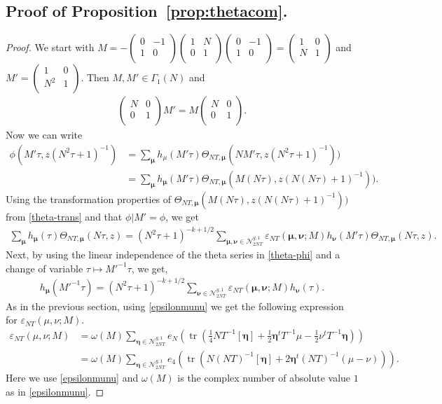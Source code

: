 \documentclass[11pt]{amsart}
\numberwithin{equation}{section}
\newcommand{\mc}{\mathcal}
\newcommand{\smat}[4]{\left( \begin{smallmatrix} #1 & #2 \\ #3 & #4 \\ \end{smallmatrix} \right)}
\DeclareMathOperator{\tr}{tr}
\newcommand{\sumn}{\sum \nolimits}
\begin{document}
\subsection{Proof of Proposition~\ref{prop:thetacom}.}
\begin{proof}
We start with $M=-\smat{0}{-1}{1}{0}\smat{1}{N}{0}{1}\smat{0}{-1}{1}{0}= \smat{1}{0}{N}{1}$ and $M'=\smat{1}{0}{N^2}{1}$. Then $M, M'\in \Gamma_1(N)$ and
\begin{align}\label{commuteN}
    \smat{N}{0}{0}{1}M'= M\smat{N}{0}{0}{1}.
\end{align} 
Now we can write
\begin{align}
    \phi(M'\tau, z(N^2\tau+1)^{-1}) &= \sumn_{\bm\mu} h_\mu(M'\tau)\Theta_{NT, \bm\mu}(NM'\tau, z(N^2\tau+1)^{-1}))\\
    &= \sumn_{\bm\mu} h_{\bm\mu}(M'\tau)\Theta_{NT, \bm\mu}(M(N\tau), z(N(N\tau)+1)^{-1})).
\end{align}
Using the transformation properties of $\Theta_{ N T, \bm\mu}(M(N\tau), z(N(N\tau)+1)^{-1}))$ from \eqref{theta-trans} and that $\phi|M'=\phi$, we get
\begin{align} \label{theta-phi}
\sum_{\bm\mu}h_{\bm\mu}(\tau) \Theta_{NT,\bm\mu}(N\tau, z)= (N^2\tau+1)^{-k+1/2}\sum_{\bm\mu, \bm\nu\in \mc N_{2NT}^{g,1}}\varepsilon_{NT}(\bm\mu, \bm\nu; M) h_{\bm\nu}(M'\tau)   \Theta_{NT, \bm\mu}(N\tau,z) .
\end{align}
Next, by using the linear independence of the theta series in \eqref{theta-phi} and a change of variable $\tau\mapsto M'^{-1}\tau$, we get,
\begin{align}\label{hmutrans}
    h_{\bm\mu}(M'^{-1}\tau)= (N^2\tau+1)^{-k+1/2}\sumn_{\bm\nu\in\mc N_{2NT}^{g,1} }\varepsilon_{NT}(\bm\mu, \bm\nu;M) h_{\bm\nu}(\tau).
\end{align}
As in the previous section, using \eqref{epsilonmunu} we get the following expression for $\varepsilon_{NT}(\mu, \nu; M)$.
\begin{align}
    \varepsilon_{NT}(\mu, \nu;M)&= \omega(M)\sumn_{\bm{\eta}\in \mc N_{2NT}^{g,1}} e_N\left(\tr(\frac{1}{4} NT^{-1}[\bm\eta]+ \frac{1}{2}\bm\eta^t T^{-1}\mu- \frac{1}{2}\nu^t T^{-1}\bm\eta)\right)\\
    &= \omega(M)\sumn_{\bm\eta\in \mc N_{2NT}^{g,1}} e_4\left(\tr(N (NT)^{-1}[\bm\eta]+2\bm\eta^t(NT)^{-1}(\mu-\nu) )\right).
\end{align}
Here we use \eqref{epsilonmunu} and $\omega(M)$ is the complex number of absolute value $1$ as in \eqref{epsilonmunu}.


\end{proof}
\end{document}
